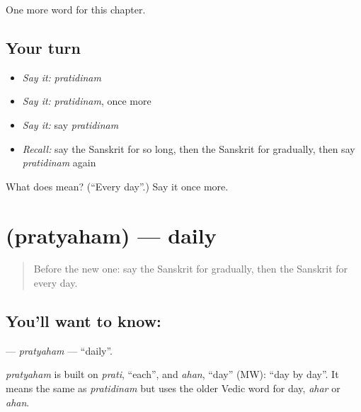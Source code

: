 \begin{grammarlens}[title={What you've built}]
One more word for this chapter.
\end{grammarlens}

\subsection*{Your turn}
\begin{itemize}
\raggedright
  \item \emph{Say it:} \emph{pratidinam}
  \item \emph{Say it:} \emph{pratidinam}, once more
  \item \emph{Say it:} say \emph{pratidinam}
  \item \emph{Recall:} say the Sanskrit for so long, then the Sanskrit for gradually, then say \emph{pratidinam} again
\end{itemize}

\begin{tcolorbox}[breakable,colback=teal!4,colframe=teal!35!black,title={Before you move on}]
What does  mean? (\textquotedblleft{}Every day\textquotedblright{}.) Say it once more.
\end{tcolorbox}
\section[\texorpdfstring{\sk{प्रत्यहम्} (pratyaham)}{प्रत्यहम् (pratyaham)}]{ (pratyaham) — daily}

\label{lesson:SA-C240-pratyaham}



\begin{quote}
Before the new one: say the Sanskrit for gradually, then the Sanskrit for every day.
\end{quote}

\subsection*{You'll want to know: }
\textbf{} — \emph{pratyaham} — \textquotedblleft{}daily\textquotedblright{}.

\begin{cousinweb}
\emph{pratyaham} is built on \emph{prati}, \textquotedblleft{}each\textquotedblright{}, and \emph{ahan}, \textquotedblleft{}day\textquotedblright{} (MW): \textquotedblleft{}day by day\textquotedblright{}. It means the same as \emph{pratidinam} but uses the older Vedic word for day, \emph{ahar} or \emph{ahan}.
\end{cousinweb}

